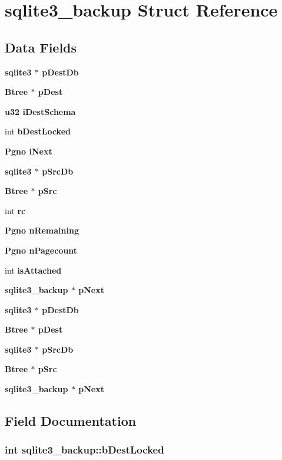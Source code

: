 \section{sqlite3\_\-backup Struct Reference}
\label{structsqlite3__backup}
\subsection*{Data Fields}
\begin{CompactItemize}
\item 
\bf{sqlite3} $\ast$ \bf{p\-Dest\-Db}
\item 
\bf{Btree} $\ast$ \bf{p\-Dest}
\item 
\bf{u32} \bf{i\-Dest\-Schema}
\item 
int \bf{b\-Dest\-Locked}
\item 
\bf{Pgno} \bf{i\-Next}
\item 
\bf{sqlite3} $\ast$ \bf{p\-Src\-Db}
\item 
\bf{Btree} $\ast$ \bf{p\-Src}
\item 
int \bf{rc}
\item 
\bf{Pgno} \bf{n\-Remaining}
\item 
\bf{Pgno} \bf{n\-Pagecount}
\item 
int \bf{is\-Attached}
\item 
\bf{sqlite3\_\-backup} $\ast$ \bf{p\-Next}
\item 
\bf{sqlite3} $\ast$ \bf{p\-Dest\-Db}
\item 
\bf{Btree} $\ast$ \bf{p\-Dest}
\item 
\bf{sqlite3} $\ast$ \bf{p\-Src\-Db}
\item 
\bf{Btree} $\ast$ \bf{p\-Src}
\item 
\bf{sqlite3\_\-backup} $\ast$ \bf{p\-Next}
\end{CompactItemize}


\subsection{Field Documentation}
\subsubsection{\setlength{\rightskip}{0pt plus 5cm}int \bf{sqlite3\_\-backup::b\-Dest\-Locked}}\label{structsqlite3__backup_fae9f9a5f8281ba02f5c6349a5e8dfce}


